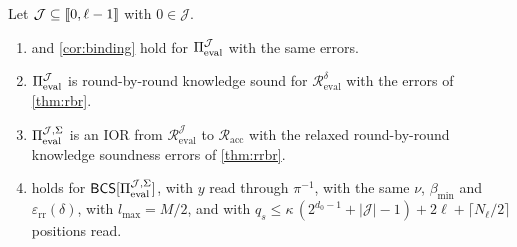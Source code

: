 \begin{theorem}\label{thm:skip}
Let $\mathcal{J} \subseteq \llbracket 0, \ell-1 \rrbracket$ with $0 \in \mathcal{J}$.
\begin{enumerate}
  \item {} and \cref{cor:binding} hold for $\Pi_{\mathrm{eval}}^{\mathcal{J}}$ with the same errors.
  \item $\Pi_{\mathrm{eval}}^{\mathcal{J}}$ is round-by-round knowledge sound for $\mathcal{R}^{\delta}_{\mathrm{eval}}$ with the errors of \cref{thm:rbr}.
  \item $\Pi_{\mathrm{eval}}^{\mathcal{J},\Sigma}$ is an IOR from $\mathcal{R}^{\mathcal{J}}_{\mathrm{eval}}$ to $\mathcal{R}_{\mathrm{acc}}$ with the relaxed round-by-round knowledge soundness errors of \cref{thm:rrbr}.
  \item {} holds for $\mathsf{BCS}[\Pi_{\mathrm{eval}}^{\mathcal{J},\Sigma}]$, with $y$ read through $\pi^{-1}$, with the same $\nu$, $\beta_{\min}$ and $\varepsilon_{\mathrm{rr}}(\delta)$, with $l_{\max} = M/2$, and with $q_s \le \kappa\,(2^{d_0 - 1} + |\mathcal{J}| - 1) + 2\ell + \lceil N_\ell/2 \rceil$ positions read.
\end{enumerate}
\end{theorem}

